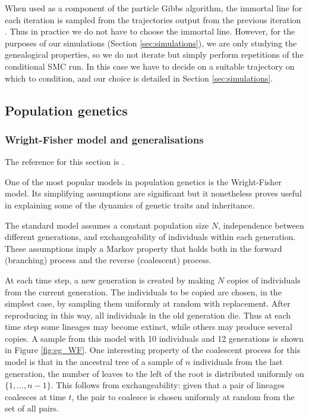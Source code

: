 \documentclass{article}
\begin{document}
When used as a component of the particle Gibbs algorithm, the immortal line for each iteration is sampled from the trajectories output from the previous iteration \citep[Section 2.4.3]{andrieu2010}. Thus in practice we do not have to choose the immortal line. However, for the purposes of our simulations (Section \ref{sec:simulations}), we are only studying the genealogical properties, so we do not iterate but simply perform repetitions of the conditional SMC run. In this case we have to decide on a suitable trajectory on which to condition, and our choice is detailed in Section \ref{sec:simulations}.


\subsection{Population genetics}\label{sec:popgen}
\subsubsection{Wright-Fisher model and generalisations}\label{sec:wf_models}
The reference for this section is \citet[Chapter 3]{wakeley2009}.

One of the most popular models in population genetics is the Wright-Fisher model. Its simplifying assumptions are significant but it nonetheless proves useful in explaining some of the dynamics of genetic traits and inheritance. 

The standard model assumes a constant population size $N$, independence between different generations, and exchangeability of individuals within each generation. These assumptions imply a Markov property that holds both in the forward (branching) process and the reverse (coalescent) process.

At each time step, a new generation is created by making $N$ copies of individuals from the current generation. The individuals to be copied are chosen, in the simplest case, by sampling them uniformly at random with replacement. 
After reproducing in this way, all individuals in the old generation die. Thus at each time step some lineages may become extinct, while others may produce several copies. 
A sample from this model with 10 individuals and 12 generations is shown in Figure \ref{fig:eg_WF}. 
One interesting property of the coalescent process for this model is that in the ancestral tree of a sample of $n$ individuals from the last generation, the number of leaves to the left of the root is distributed uniformly on $\{1,\dots,n-1\}$. This follows from exchangeability: given that a pair of lineages coalesces at time $t$, the pair to coalesce is chosen uniformly at random from the set of all pairs.
\end{document}
